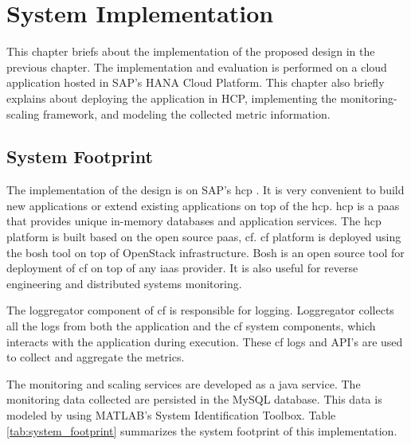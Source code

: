 \documentclass[article,type=msc,colorback,12pt,accentcolor=tud8b,table]{tudthesis}
\begin{document}
 \cleardoublepage
 
 \hfill  
 \section{System Implementation}
 \hfill \break
 
This chapter briefs about the implementation of the proposed design in the previous chapter. The implementation and evaluation is performed on a cloud application hosted in SAP's HANA Cloud Platform. This chapter also briefly explains about deploying the application in HCP, implementing the monitoring-scaling framework, and modeling the collected metric information.

\subsection{System Footprint}
The implementation of the design is on SAP's \gls{hcp} \cite{hcp}. It is very convenient to build new applications or extend existing applications on top of the \gls{hcp}. \gls{hcp} is a \gls{paas} that provides unique in-memory databases and application services. The \gls{hcp} platform is built based on the open source \gls{paas}, \gls{cf}. \gls{cf} platform is deployed using the bosh tool on top of OpenStack infrastructure. Bosh is an open source tool for deployment of \gls{cf} on top of any \gls{iaas} provider. It is also useful for reverse engineering and distributed systems monitoring.

The loggregator component of \gls{cf} is responsible for logging. Loggregator collects all the logs from both the application and the \gls{cf} system components, which interacts with the application during execution. These \gls{cf} logs and API's are used to collect and aggregate the metrics. 

The monitoring and scaling services are developed as a java service. The monitoring data collected are persisted in the MySQL database. This data is modeled by using MATLAB's System Identification Toolbox. Table \ref{tab:system_footprint} summarizes the system footprint of this implementation.
\end{document}
